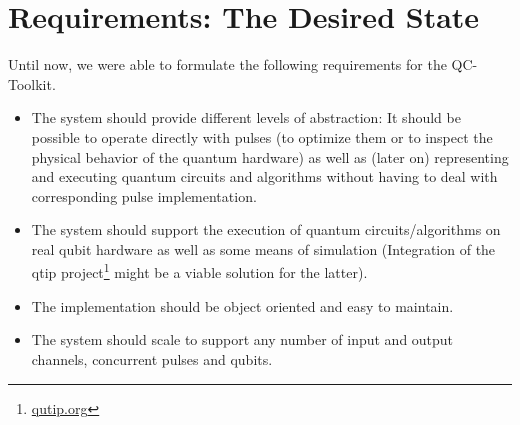 \documentclass[a4paper,12pt]{article}
\begin{document}
\section{Requirements: The Desired State}
\label{sec:Requirements}
Until now, we were able to formulate the following requirements for the QC-Toolkit.
\begin{itemize} \itemsep-0.5pt
 \item The system should provide different levels of abstraction: It should be possible to operate directly with pulses (to optimize them or to inspect the physical behavior of the quantum hardware) as well as (later on) representing and executing quantum circuits and algorithms without having to deal with corresponding pulse implementation.
  \item The system should support the execution of quantum circuits/algorithms on real qubit hardware as well as some means of simulation (Integration of the qtip project\footnote{\href{http://qutip.org/}{qutip.org}} might be a viable solution for the latter).
  \item The implementation should be object oriented and easy to maintain.
  \item The system should scale to support any number of input and output channels, concurrent pulses and qubits.
\end{itemize}
\end{document}
